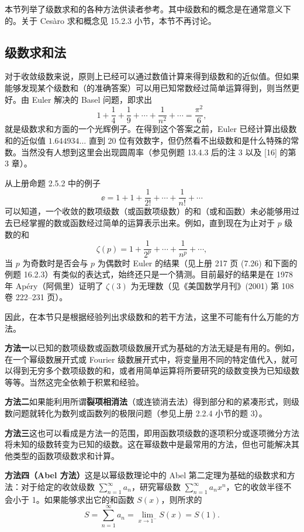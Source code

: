 本节列举了级数求和的各种方法供读者参考。其中级数和的概念是在通常意义下的。关于 Cesàro 求和概念见 15.2.3 小节，本节不再讨论。

\subsection{级数求和法}

对于收敛级数来说，原则上已经可以通过数值计算来得到级数和的近似值。但如果能够发现某个级数和（的准确答案）可以用已知常数经过简单运算得到，则当然更好。由 Euler 解决的 Basel 问题，即求出
\[
  1+\frac14+\frac19+\cdots+\frac1{n^2}+\cdots=\frac{\pi^2}{6},
\]
就是级数求和方面的一个光辉例子。在得到这个答案之前，Euler 已经计算出级数和的近似值 $1.644934\ldots$ 直到 20 位有效数字，但仍然看不出级数和是什么特殊的常数。当然没有人想到这里会出现圆周率（参见例题 13.4.3 后的注 3 以及 [16] 的第 3 章）。

从上册命题 2.5.2 中的例子
\[
  \ee=1+1+\frac1{2!}+\cdots+\frac1{n!}+\cdots
\]
可以知道，一个收敛的数项级数（或函数项级数）的和（或和函数）未必能够用过去已经掌握的数或函数经过简单的运算表示出来。例如，直到现在为止对于 $p$ 级数的和
\[
  \zeta(p)=1+\frac1{2^p}+\cdots+\frac1{n^p}+\cdots,
\]
当 $p$ 为奇数时是否会与 $p$ 为偶数时 Euler 的结果（见上册 217 页 (7.26) 和下面的例题 16.2.3）有类似的表达式，始终还只是一个猜测。目前最好的结果是在 1978 年 Apéry（阿佩里）证明了 $\zeta(3)$ 为无理数（见《美国数学月刊》(2001) 第 108 卷 222--231 页）。

因此，在本节只是根据经验列出求级数和的若干方法，这里不可能有什么万能的方法。

\textbf{方法一}\quad 以已知的数项级数或函数项级数展开式为基础的方法无疑是有用的。例如，在一个幂级数展开式或 Fourier 级数展开式中，将变量用不同的特定值代入，就可以得到无穷多个数项级数的和，或者用简单运算将所要研究的级数变换为已知级数等等。当然这完全依赖于积累和经验。

\textbf{方法二}\quad 如果能利用所谓\textbf{裂项相消法}（或连锁消去法）得到部分和的紧凑形式，则级数问题就转化为数列或函数列的极限问题（参见上册 2.2.4 小节的题 3）。

\textbf{方法三}\quad 这也可以看成是方法一的范围，即用函数项级数的逐项积分或逐项微分方法将未知的级数转变为已知的级数。这在幂级数中是最常用的方法，但也可能解决其他类型的函数项级数求和计算。

\textbf{方法四（Abel 方法）}\quad 这是以幂级数理论中的 Abel 第二定理为基础的级数求和方法：对于给定的收敛级数 $\sum_{n=1}^{\infty}a_n$，研究幂级数 $\sum_{n=1}^{\infty}a_nx^n$，它的收敛半径不会小于 1。如果能够求出它的和函数 $S(x)$，则所求的
\[
  S=\sum_{n=1}^{\infty}a_n=\lim_{x\to1^-}S(x)=S(1).
\]

